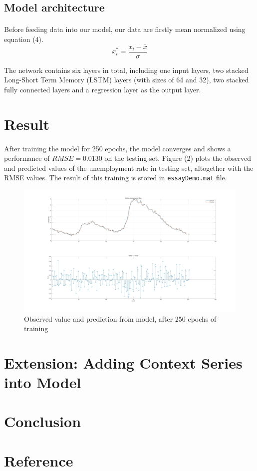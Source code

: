 \documentclass[11pt]{article}
\begin{document}
\subsection{Model architecture}
\paragraph{} Before feeding data into our model, our data are firstly mean normalized using equation (4).
\begin{equation}
    x^*_i = \frac{x_i - \overline{x}}{\sigma}
\end{equation}

The network contains six layers in total, including one input layers, two stacked Long-Short Term Memory (LSTM) layers (with sizes of 64 and 32), two stacked fully connected layers and a regression layer as the output layer. 

\section{Result}
\paragraph{} After training the model for 250 epochs, the model converges and shows a performance of $RMSE=0.0130$ on the testing set. Figure (2) plots the observed and predicted values of the unemployment rate in testing set, altogether with the RMSE values. The result of this training is stored in \texttt{essayDemo.mat} file.

\begin{figure}[H]
    \centering
    \includegraphics[width=\linewidth]{result}
    \caption{Observed value and prediction from model, after 250 epochs of training}
\end{figure}


\section{Extension: Adding Context Series into Model}
\section{Conclusion}
\section{Reference}
\end{document}
